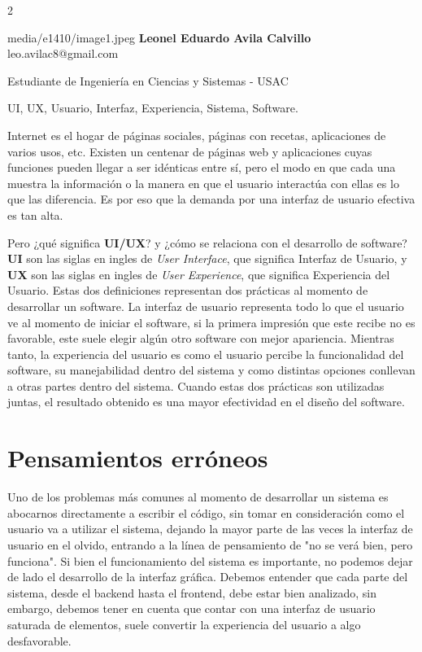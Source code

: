 \documentclass[12pt,spanish,Letterpaper,openany]{book}
\let\BeginKnitrBlock\begin \let\EndKnitrBlock\end
\begin{document}
\begin {multicols}{2}

\BeginKnitrBlock{photobiography3}{media/e1410/image1.jpeg}
\textbf{Leonel Eduardo Avila Calvillo}\\
leo.avilac8@gmail.com

\medskip

Estudiante de Ingeniería en Ciencias y Sistemas - USAC\\

\medskip

UI, UX, Usuario, Interfaz, Experiencia, Sistema, Software.
\EndKnitrBlock{photobiography3}

Internet es el hogar de páginas sociales, páginas con recetas, aplicaciones de varios usos, etc. Existen un centenar de páginas web y aplicaciones cuyas funciones pueden llegar a ser idénticas entre sí, pero el modo en que cada una muestra la información o la manera en que el usuario interactúa con ellas es lo que las diferencia. Es por eso que la demanda por una interfaz de usuario efectiva es tan alta.

Pero ¿qué significa \textbf{UI/UX}? y ¿cómo se relaciona con el desarrollo de software? \textbf{UI} son las siglas en ingles de \emph{User Interface}, que significa Interfaz de Usuario, y \textbf{UX} son las siglas en ingles de \emph{User Experience}, que significa Experiencia del Usuario. Estas dos definiciones representan dos prácticas al momento de desarrollar un software. La interfaz de usuario representa todo lo que el usuario ve al momento de iniciar el software, si la primera impresión que este recibe no es favorable, este suele elegir algún otro software con mejor apariencia. Mientras tanto, la experiencia del usuario es como el usuario percibe la funcionalidad del software, su manejabilidad dentro del sistema y como distintas opciones conllevan a otras partes dentro del sistema. Cuando estas dos prácticas son utilizadas juntas, el resultado obtenido es una mayor efectividad en el diseño del software.

\hypertarget{pensamientos-erruxf3neos}{%
\section{Pensamientos erróneos}\label{pensamientos-erruxf3neos}}

Uno de los problemas más comunes al momento de desarrollar un sistema es abocarnos directamente a escribir el código, sin tomar en consideración como el usuario va a utilizar el sistema, dejando la mayor parte de las veces la interfaz de usuario en el olvido, entrando a la línea de pensamiento de "no se verá bien, pero funciona". Si bien el funcionamiento del sistema es importante, no podemos dejar de lado el desarrollo de la interfaz gráfica. Debemos entender que cada parte del sistema, desde el backend hasta el frontend, debe estar bien analizado, sin embargo, debemos tener en cuenta que contar con una interfaz de usuario saturada de elementos, suele convertir la experiencia del usuario a algo desfavorable.


\end{multicols}
\end{document}
